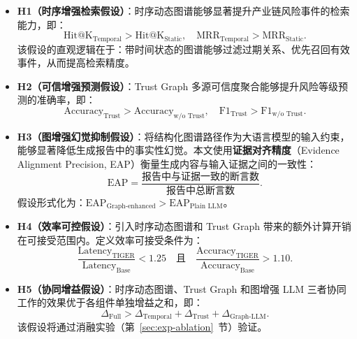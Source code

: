 \documentclass[12pt,a4paper]{article}
\newcommand{\term}[1]{\textbf{#1}}
\begin{document}
\begin{itemize}
    \item \term{H1（时序增强检索假设）}：时序动态图谱能够显著提升产业链风险事件的检索能力，即：
    \begin{equation}
    \text{Hit@K}_{\text{Temporal}} > \text{Hit@K}_{\text{Static}}, \quad \text{MRR}_{\text{Temporal}} > \text{MRR}_{\text{Static}}.
    \end{equation}
    该假设的直观逻辑在于：带时间状态的图谱能够过滤过期关系、优先召回有效事件，从而提高检索精度。

    \item \term{H2（可信增强预测假设）}：Trust Graph 多源可信度聚合能够提升风险等级预测的准确率，即：
    \begin{equation}
    \text{Accuracy}_{\text{Trust}} > \text{Accuracy}_{\text{w/o Trust}}, \quad \text{F1}_{\text{Trust}} > \text{F1}_{\text{w/o Trust}}.
    \end{equation}

    \item \term{H3（图增强幻觉抑制假设）}：将结构化图谱路径作为大语言模型的输入约束，能够显著降低生成报告中的事实性幻觉。本文使用\textbf{证据对齐精度}（Evidence Alignment Precision, EAP）衡量生成内容与输入证据之间的一致性：
    \begin{equation}
    \text{EAP} = \frac{\text{报告中与证据一致的断言数}}{\text{报告中总断言数}}.
    \end{equation}
    假设形式化为：$\text{EAP}_{\text{Graph-enhanced}} > \text{EAP}_{\text{Plain LLM}}$。

    \item \term{H4（效率可控假设）}：引入时序动态图谱和 Trust Graph 带来的额外计算开销在可接受范围内。定义效率可接受条件为：
    \begin{equation}
    \frac{\text{Latency}_{\text{TIGER}}}{\text{Latency}_{\text{Base}}} < 1.25 \quad \text{且} \quad \frac{\text{Accuracy}_{\text{TIGER}}}{\text{Accuracy}_{\text{Base}}} > 1.10.
    \end{equation}

    \item \term{H5（协同增益假设）}：时序动态图谱、Trust Graph 和图增强 LLM 三者协同工作的效果优于各组件单独增益之和，即：
    \begin{equation}
    \Delta_{\text{Full}} > \Delta_{\text{Temporal}} + \Delta_{\text{Trust}} + \Delta_{\text{Graph-LLM}}.
    \end{equation}
    该假设将通过消融实验（第~\ref{sec:exp-ablation}~节）验证。
\end{itemize}
\end{document}
